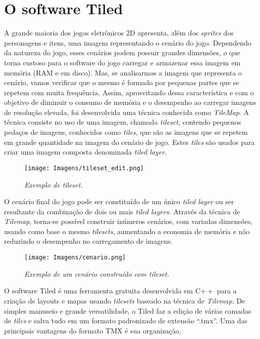 \section{O software Tiled}
\label{tiled}
%
A grande maioria dos jogos eletrônicos 2D apresenta, além dos \textit{sprites} dos personagens e itens, uma imagem representando o cenário do jogo.
Dependendo da natureza do jogo, esses cenários podem possuir grandes dimensões, o que torna custoso para o software do jogo carregar e 
armazenar essa imagem em memória (RAM e em disco). Mas, se analisarmos a imagem que representa o cenário, vamos verificar que o mesmo é formado
por pequenas partes que se repetem com muita frequência. Assim, aproveitando dessa característica e com o objetivo de diminuir o consumo de
memória e o desempenho ao carregar imagens de resolução elevada, foi desenvolvida uma técnica conhecida como \textit{TileMap}. A técnica
consiste no uso de uma imagem, chamada \textit{tileset}, contendo pequenos pedaços de imagens, conhecidos como \textit{tiles}, que são
as imagens que se repetem em grande quantidade na imagem do cenário de jogo. Estes \textit{tiles} são usados 
para criar uma imagem composta denominada \textit{tiled layer}.
%
%
\begin{figure}[H]
    \centering
    \texttt{[image: Imagens/tileset\_edit.png]}
    \caption{\textit{Exemplo de \textit{tileset}.}}
    \label{tileset_example}
\end{figure}
%
\par
%
O cenário final do jogo pode ser constituído de um único \textit{tiled layer} ou ser resultante da combinação 
de dois ou mais \textit{tiled layers}. Através da técnica de \textit{Tilemap}, torna-se possível construir inúmeros cenários,
com variadas dimensões, usando como base o mesmo \textit{tilesets}, aumentando a economia de memória e não reduzindo o desempenho 
no carregamento de imagens.
%
%
%
\begin{figure}[H]
    \centering
    \texttt{[image: Imagens/cenario.png]}
    \caption{\textit{Exemplo de um cenário construído com tileset.}}
    \label{cenario_example}
\end{figure}
%
%
\par
O software Tiled \cite{SiteTiled} é uma ferramenta gratuita desenvolvida em C$++$ para a criação de layouts e mapas usando \textit{tilesets}
baseado na técnica de \textit{Tilemap}. De simples manuseio e grande versatilidade, o Tiled faz a edição de várias camadas 
de \textit{tiles} e salva tudo em um formato padronizado de extensão ``.tmx''. Uma das principais vantagens do formato TMX é sua organização, 
